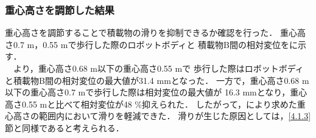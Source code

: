 \subsubsection{重心高さを調節した結果}
重心高さを調節することで積載物の滑りを抑制できるか確認を行った．
重心高さ0.7 m，0.55 mで歩行した際のロボットボディと
積載物B間の相対変位をに示す．\\
　より，重心高さ0.68 m以下の重心高さ0.55 mで
歩行した際はロボットボディと積載物B間の相対変位の最大値が31.4 mmとなった．
一方で，重心高さ0.68 m以下の重心高さ0.7 mで歩行した際は相対変位の最大値が
16.3 mmとなり，重心高さ0.55 mと比べて相対変位が48 \%抑えられた．
したがって，により求めた重心高さの範囲内において滑りを軽減できた．
滑りが生じた原因としては，\ref{4.1.3}節と同様であると考えられる．\\

